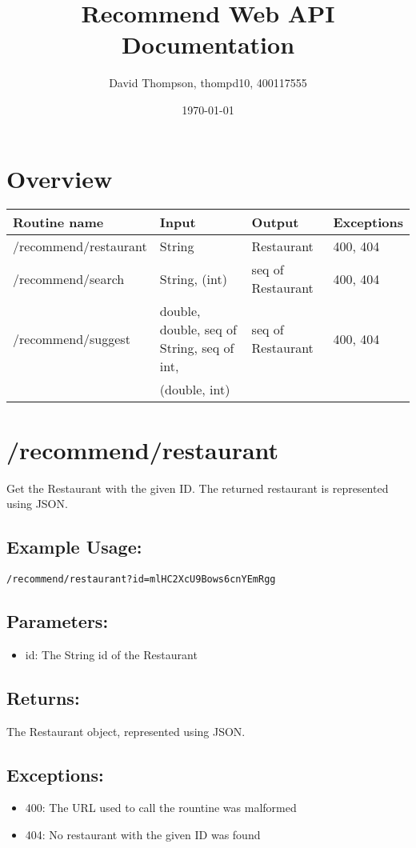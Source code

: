 \documentclass{article}
\title{Recommend Web API Documentation}
\author{David Thompson, thompd10, 400117555}
\date{\today}
\begin{document}
\maketitle

\section*{Overview}

\begin{tabular}{| l | l | l | l |}
  \hline
  \textbf{Routine name} & \textbf{Input} & \textbf{Output} & \textbf{Exceptions} \\
  \hline
  /recommend/restaurant & String & Restaurant & 400, 404 \\
  \hline
  /recommend/search & String, (int) & seq of Restaurant & 400, 404  \\
  \hline
  /recommend/suggest & double, double, seq of String, seq of int, & seq of Restaurant&  400, 404 \\ 
  & (double, int) & & \\
  \hline
\end{tabular}

\newpage

\section*{/recommend/restaurant}
Get the Restaurant with the given ID. The returned restaurant is represented
using JSON.
\subsection*{Example Usage:}
\begin{verbatim}
/recommend/restaurant?id=mlHC2XcU9Bows6cnYEmRgg
\end{verbatim}
\subsection*{Parameters:}
\begin{itemize}
  \item id: The String id of the Restaurant
\end{itemize}
\subsection*{Returns:}
The Restaurant object, represented using JSON.
\subsection*{Exceptions:}
\begin{itemize}
  \item 400: The URL used to call the rountine was malformed
  \item 404: No restaurant with the given ID was found
\end{itemize}
\end{document}
